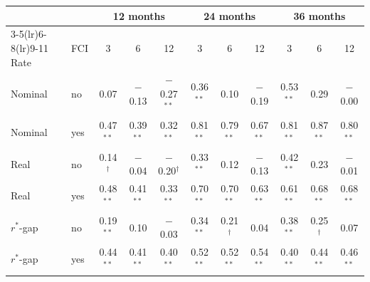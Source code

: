 \begin{tabular}{llccccccccc}
\toprule
 & & \multicolumn{3}{c}{12 months} & \multicolumn{3}{c}{24 months} & \multicolumn{3}{c}{36 months}\\
\cmidrule(lr){3-5}\cmidrule(lr){6-8}\cmidrule(lr){9-11}
Rate & FCI & 3 & 6 & 12 & 3 & 6 & 12 & 3 & 6 & 12 \\
\midrule
Nominal & no & 0.07 & $-$0.13 & $-$0.27$^{**}$ & 0.36$^{**}$ & 0.10 & $-$0.19 & 0.53$^{**}$ & 0.29 & $-$0.00 \\
Nominal & yes & 0.47$^{**}$ & 0.39$^{**}$ & 0.32$^{**}$ & 0.81$^{**}$ & 0.79$^{**}$ & 0.67$^{**}$ & 0.81$^{**}$ & 0.87$^{**}$ & 0.80$^{**}$ \\
\midrule
Real & no & 0.14$^{\dagger}$ & $-$0.04 & $-$0.20$^{\dagger}$ & 0.33$^{**}$ & 0.12 & $-$0.13 & 0.42$^{**}$ & 0.23 & $-$0.01 \\
Real & yes & 0.48$^{**}$ & 0.41$^{**}$ & 0.33$^{**}$ & 0.70$^{**}$ & 0.70$^{**}$ & 0.63$^{**}$ & 0.61$^{**}$ & 0.68$^{**}$ & 0.68$^{**}$ \\
\midrule
$r^*$-gap & no & 0.19$^{**}$ & 0.10 & $-$0.03 & 0.34$^{**}$ & 0.21$^{\dagger}$ & 0.04 & 0.38$^{**}$ & 0.25$^{\dagger}$ & 0.07 \\
$r^*$-gap & yes & 0.44$^{**}$ & 0.41$^{**}$ & 0.40$^{**}$ & 0.52$^{**}$ & 0.52$^{**}$ & 0.54$^{**}$ & 0.40$^{**}$ & 0.44$^{**}$ & 0.46$^{**}$ \\
\bottomrule
\end{tabular}
